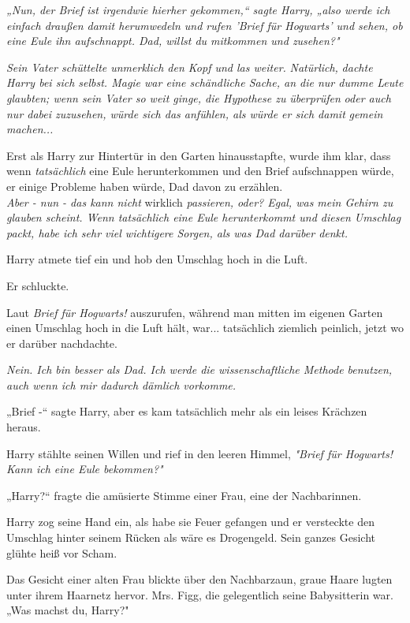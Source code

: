 {\emph{„Nun, der Brief ist irgendwie hierher gekommen,“ sagte Harry, „also werde ich einfach draußen damit herumwedeln und rufen 'Brief für Hogwarts' und sehen, ob eine Eule ihn aufschnappt. Dad, willst du mitkommen und zusehen?"}

\emph{Sein Vater schüttelte unmerklich den Kopf und las weiter.} \emph{\emph{Natürlich,}} \emph{dachte Harry bei sich selbst. Magie war eine schändliche Sache, an die nur dumme Leute glaubten; wenn sein Vater so weit ginge, die Hypothese zu} \emph{\emph{überprüfen}} \emph{oder auch nur dabei zuzusehen, würde sich das anfühlen, als würde er sich damit} \emph{\emph{gemein machen}...}

Erst als Harry zur Hintertür in den Garten hinausstapfte, wurde ihm klar, dass wenn \emph{tatsächlich} eine Eule herunterkommen und den Brief aufschnappen würde, er einige Probleme haben würde, Dad davon zu erzählen.\\ \emph{Aber - nun - das kann nicht} wirklich \emph{passieren, oder? Egal, was mein Gehirn zu glauben scheint. Wenn tatsächlich eine Eule herunterkommt und diesen Umschlag packt, habe ich sehr viel wichtigere Sorgen, als was Dad darüber denkt.}

Harry atmete tief ein und hob den Umschlag hoch in die Luft.

Er schluckte.

Laut \emph{Brief für Hogwarts!} auszurufen, während man mitten im eigenen Garten einen Umschlag hoch in die Luft hält, war... tatsächlich ziemlich peinlich, jetzt wo er darüber nachdachte.

\emph{Nein. Ich bin besser als Dad. Ich werde die wissenschaftliche Methode benutzen, auch wenn ich mir dadurch dämlich vorkomme.}

„Brief -“ sagte Harry, aber es kam tatsächlich mehr als ein leises Krächzen heraus.

Harry stählte seinen Willen und rief in den leeren Himmel, \emph{"Brief für Hogwarts! Kann ich eine Eule bekommen?"}

„Harry?“ fragte die amüsierte Stimme einer Frau, eine der Nachbarinnen.

Harry zog seine Hand ein, als habe sie Feuer gefangen und er versteckte den Umschlag hinter seinem Rücken als wäre es Drogengeld. Sein ganzes Gesicht glühte heiß vor Scham.

Das Gesicht einer alten Frau blickte über den Nachbarzaun, graue Haare lugten unter ihrem Haarnetz hervor. Mrs. Figg, die gelegentlich seine Babysitterin war. „Was machst du, Harry?"

}

